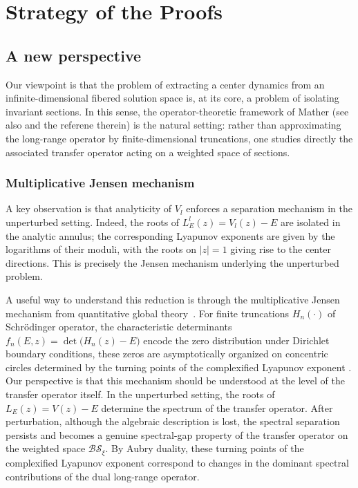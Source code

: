 \documentclass[reqno,11pt]{amsart}
\begin{document}
\section{Strategy of the Proofs}


\subsection{A new perspective} 
Our viewpoint is that the problem of extracting a center dynamics from an infinite-dimensional fibered solution space is, at its core, a problem of isolating invariant sections. In this sense, the operator-theoretic framework of Mather \cite{Mather1968} (see also \cite{HaroDeLaLlave,LS90} and the referene therein) is the natural setting: rather than approximating the long-range operator by finite-dimensional truncations, one studies directly the associated transfer operator acting on a weighted space of sections.

\subsubsection{Multiplicative Jensen mechanism}\label{jensen}
A key observation is that analyticity of  $V_l$ enforces a separation mechanism in the unperturbed setting. Indeed, the roots of $L_E^{l}(z)=V_l(z)-E$ are isolated in the analytic annulus; the corresponding Lyapunov exponents are given by the logarithms of their moduli, with the roots on $|z|=1$ giving rise to the center directions. This is precisely the Jensen mechanism underlying the unperturbed problem.

A useful way to understand this reduction is through the multiplicative Jensen mechanism from quantitative global theory~\cite{GJYZ,HS4}.
 For finite truncations $H_n(\cdot)$ of Schr\"odinger operator, the characteristic determinants 
$f_n(E,z)=\det\bigl(H_n(z)-E\bigr)$
encode the zero distribution under Dirichlet boundary conditions, these zeros are asymptotically organized on concentric circles determined by the turning points of the complexified Lyapunov exponent \cite{GS1,HS,WWYZ}.  
Our perspective is that this mechanism should be understood at the level of the transfer operator itself. In the unperturbed setting, the roots of $L_E(z)=V(z)-E$ determine the spectrum  of the transfer operator. After perturbation, although the algebraic description is lost, the spectral separation persists and becomes a genuine spectral-gap property of the transfer operator on the weighted space $\mathcal{BS}_\xi$. By Aubry duality, these turning points of the complexified
Lyapunov exponent correspond to changes in the dominant
spectral contributions of the dual long-range operator.
\end{document}
